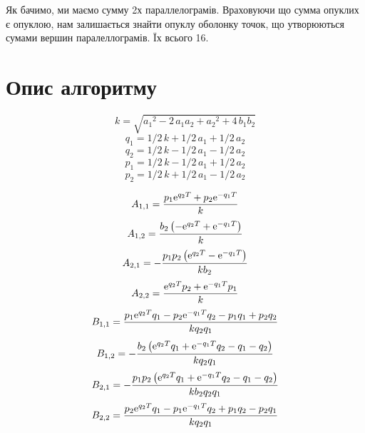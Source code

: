 \documentclass[fontsize=14pt,DIV=1,a4paper]{scrartcl}
\begin{document}
Як бачимо, ми маємо сумму 2х параллелограмів. Враховуючи що сумма опуклих є опуклою, нам залишається знайти опуклу оболонку точок, що утворюються сумами вершин паралеллограмів. Їх всього 16.

\section{Опис алгоритму}

\begin{equation}
{k}=\sqrt {{a_{{1}}}^{2}-2\,a_{{1}}a_{{2}}+{a_{{2}}}^{2}+4\,b_{{1}}b_{{2}}}
\end{equation}
\begin{equation}
q_{{1}}=1/2\,{k}+1/2\,a_{{1}}+1/2\,a_{{2}}
\end{equation}
\begin{equation}
q_{{2}}=1/2\,{k}-1/2\,a_{{1}}-1/2\,a_{{2}}
\end{equation}
\begin{equation}
p_{{1}}=1/2\,{k}-1/2\,a_{{1}}+1/2\,a_{{2}}
\end{equation}
\begin{equation}
p_{{2}}=1/2\,{k}+1/2\,a_{{1}}-1/2\,a_{{2}}
\end{equation}

\begin{equation}
A_{{1,1}}={\frac {p_{{1}}{{\rm e}^{q_{{2}}T}}+p_{{2}}{{\rm e}
^{-q_{{1}}T}}}{k}}
\end{equation}
\begin{equation}
A_{{1,2}}={\frac {b_{{2}} \left( -{{\rm e}^{q_{{2}}
T}}+{{\rm e}^{-q_{{1}}T}} \right) }{k}}
\end{equation}
\begin{equation}
A_{{2,1}}=-{\frac {p_{{1}}p_{{
2}} \left( {{\rm e}^{q_{{2}}T}}-{{\rm e}^{-q_{{1}}T}} \right) }{kb_{{2
}}}}
\end{equation}
\begin{equation}
A_{{2,2}}={\frac {{{\rm e}^{q_{{2}}T}}p_{{2}}+{{\rm e}^{-q_{{1}}T
}}p_{{1}}}{k}}
\end{equation}
\begin{equation}
B_{{1,1}}={\frac {p_{{1}}{{\rm e}^{q_{{2}}T}}q_{{1}}-p_
{{2}}{{\rm e}^{-q_{{1}}T}}q_{{2}}-p_{{1}}q_{{1}}+p_{{2}}q_{{2}}}{kq_{{
2}}q_{{1}}}}
\end{equation}
\begin{equation}
B_{{1,2}}=-{\frac {b_{{2}} \left( {{\rm e}^{q_{{2}}T}}q_{
{1}}+{{\rm e}^{-q_{{1}}T}}q_{{2}}-q_{{1}}-q_{{2}} \right) }{kq_{{2}}q_
{{1}}}}
\end{equation}
\begin{equation}
B_{{2,1}}=-{\frac {p_{{1}}p_{{2}} \left( {{\rm e}^{q_{{2}}T}}q
_{{1}}+{{\rm e}^{-q_{{1}}T}}q_{{2}}-q_{{1}}-q_{{2}} \right) }{kb_{{2}}
q_{{2}}q_{{1}}}}
\end{equation}
\begin{equation}
B_{{2,2}}={\frac {p_{{2}}{{\rm e}^{q_{{2}}T}}q_{{1}}-
p_{{1}}{{\rm e}^{-q_{{1}}T}}q_{{2}}+p_{{1}}q_{{2}}-p_{{2}}q_{{1}}}{kq_
{{2}}q_{{1}}}}
\end{equation}
\end{document}
